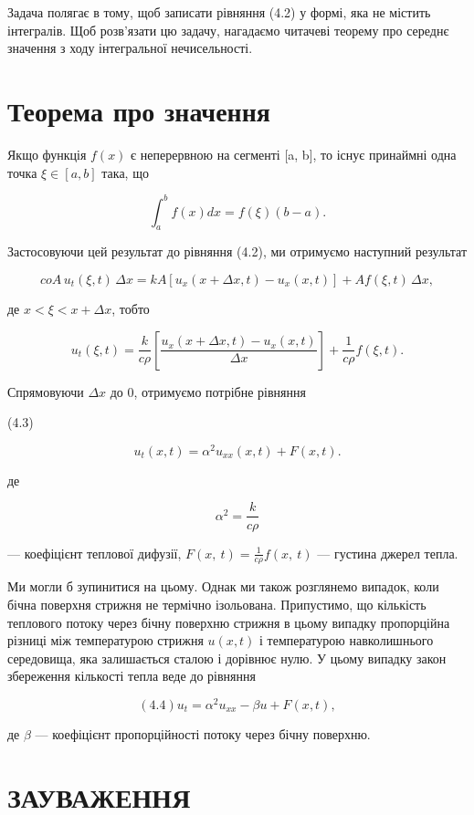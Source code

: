 \documentclass[
  ukrainian,
]{article}
\begin{document}
Задача полягає в тому, щоб записати рівняння (4.2) у формі, яка не
містить інтегралів. Щоб розв'язати цю задачу, нагадаємо читачеві теорему
про середнє значення з ходу інтегральної нечисельності.

\section{Теорема про
значення}\label{ux442ux435ux43eux440ux435ux43cux430-ux43fux440ux43e-ux437ux43dux430ux447ux435ux43dux43dux44f}

Якщо функція \(f(x)\) є неперервною на сегменті {[}a, b{]}, то існує
принаймні одна точка \(\xi \in [a, b]\) така, що

\[
\int_{a}^{b} f(x) dx = f(\xi) (b-a).
\]

Застосовуючи цей результат до рівняння (4.2), ми отримуємо наступний
результат

\[
coA\,u_t(\xi, t)\,\Delta x = kA\left[u_x(x + \Delta x, t) - u_x(x, t)\right] + Af(\xi, t)\,\Delta x,
\]

де \(x < \xi < x + \Delta x\), тобто

\[
u_t(\xi, t) = \frac{k}{c\rho}\left[\frac{u_x(x + \Delta x, t) - u_x(x, t)}{\Delta x}\right] + \frac{1}{c\rho} f(\xi, t).
\]

Спрямовуючи \(\Delta x\) до 0, отримуємо потрібне рівняння

(4.3)

\[
u_t(x, t) = \alpha^2 u_{xx}(x, t) + F(x, t).
\]

де

\[
\alpha^{2}=\frac{k}{c\rho}
\]

--- коефіцієнт теплової дифузії,
\(F\left(x,\ t\right)=\frac{1}{c\rho}f\left(x,\ t\right)\) --- густина
джерел тепла.

Ми могли б зупинитися на цьому. Однак ми також розглянемо випадок, коли
бічна поверхня стрижня не термічно ізольована. Припустимо, що кількість
теплового потоку через бічну поверхню стрижня в цьому випадку
пропорційна різниці між температурою стрижня \(u(x,t)\) і температурою
навколишнього середовища, яка залишається сталою і дорівнює нулю. У
цьому випадку закон збереження кількості тепла веде до рівняння

\[
(4.4) u_t = \alpha^2 u_{xx} - \beta u + F(x, t),
\]

де \(\beta\) --- коефіцієнт пропорційності потоку через бічну поверхню.

\section{ЗАУВАЖЕННЯ}\label{ux437ux430ux443ux432ux430ux436ux435ux43dux43dux44f-3}
\end{document}

